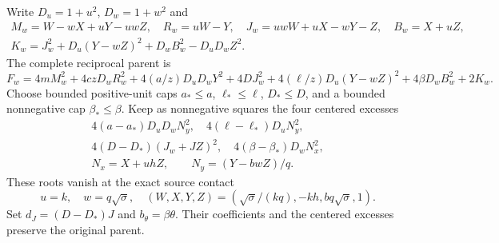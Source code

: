 Write $D_u=1+u^2$, $D_w=1+w^2$ and
\begin{gather*}
 M_w=W-wX+uY-uwZ,\quad R_w=uW-Y,\quad
 J_w=uwW+uX-wY-Z,\quad B_w=X+uZ,\\
 K_w=J_w^2+D_u(Y-wZ)^2+D_wB_w^2-D_uD_wZ^2.
\end{gather*}
The complete reciprocal parent is
\[
 F_w=4mM_w^2+4czD_wR_w^2+4(a/z)D_uD_wY^2
 +4DJ_w^2+4(\ell/z)D_u(Y-wZ)^2+4\beta D_wB_w^2+2K_w.
\]
Choose bounded positive-unit caps $a_*\leq a$, $\ell_*\leq\ell$,
$D_*\leq D$, and a bounded nonnegative cap $\beta_*\leq\beta$.
Keep as nonnegative squares the four centered excesses
\begin{gather*}
4(a-a_*)D_uD_wN_y^2,\quad4(\ell-\ell_*)D_uN_y^2,\\
4(D-D_*)(J_w+JZ)^2,\quad4(\beta-\beta_*)D_wN_x^2,\\
N_x=X+uhZ,\qquad N_y=(Y-bwZ)/q.
\end{gather*}
These roots vanish at the exact source contact
\[
u=k,\quad w=q\sqrt\sigma,\quad
(W,X,Y,Z)=(\sqrt\sigma/(kq),-kh,bq\sqrt\sigma,1).
\]
Set $d_J=(D-D_*)J$ and $b_\theta=\beta\theta$.
Their coefficients and the centered excesses preserve the original parent.

